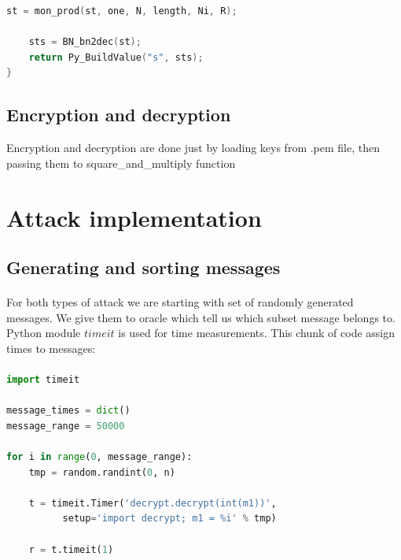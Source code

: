 \documentclass[thesis=B,english]{FITthesis}[2012/10/20]
\begin{document}
{{\begin{lstlisting}[language=C]
    st = mon_prod(st, one, N, length, Ni, R);

    sts = BN_bn2dec(st);
    return Py_BuildValue("s", sts);
}
\end{lstlisting}



\subsection{Encryption and decryption}{
Encryption and decryption are done just by loading keys from .pem file, then passing them to square\_and\_multiply function
}

\section{Attack implementation}

\subsection{Generating and sorting messages}
\paragraph*{}{ 
For both types of attack we are starting with set of randomly generated messages. We give them to oracle which tell us which subset message belongs to. Python module \(timeit\) is used for time measurements. This chunk of code assign times to messages:
}
\paragraph*{}
\begin{minipage}{\linewidth}


\begin{lstlisting}[language=Python]
import timeit

message_times = dict()
message_range = 50000

for i in range(0, message_range):
    tmp = random.randint(0, n)

    t = timeit.Timer('decrypt.decrypt(int(m1))', 
	      setup='import decrypt; m1 = %i' % tmp)

    r = t.timeit(1)


\end{lstlisting}
\end{minipage}}}
\end{document}
